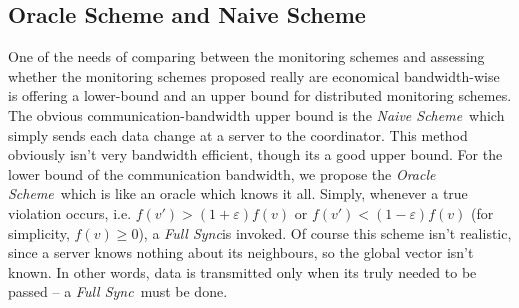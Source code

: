 \documentclass[10pt, conference]{IEEEtran}
\newcommand{\fullSync}{\textit{Full Sync}}
\newcommand{\naiveScheme}{\textit{Naive Scheme}}
\newcommand{\oracleScheme}{\textit{Oracle Scheme}}
\begin{document}
\subsection{Oracle Scheme and Naive Scheme}
One of the needs of comparing between the monitoring schemes and assessing whether the monitoring schemes proposed really are economical bandwidth-wise is offering a lower-bound and an upper bound for distributed monitoring schemes. \\
The obvious communication-bandwidth upper bound is the \naiveScheme \ which simply sends each data change at a server to the coordinator. This method obviously isn't very bandwidth efficient, though its a good upper bound.
For the lower bound of the communication bandwidth, we propose the \oracleScheme \ which is like an oracle which knows it all. Simply, whenever a true violation occurs, i.e. ${f(v') > (1
+\varepsilon)f(v)}$ or ${f(v') < (1-\varepsilon)f(v)}$ (for simplicity, ${f(v) \geq 0}$), a \fullSync is invoked. Of course this scheme isn't realistic, since a server knows nothing about its neighbours, so the global vector isn't known. In other words, data is transmitted only when its truly needed to be passed -- a \fullSync \ must be done.
\end{document}
